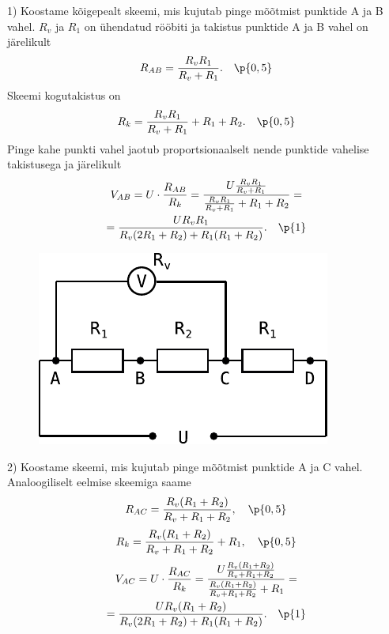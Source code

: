 1) Koostame kõigepealt skeemi, mis kujutab pinge mõõtmist punktide A ja B vahel. $R_v$ ja $R_1$ on ühendatud rööbiti ja takistus punktide A ja B vahel on järelikult
\[
R_{AB}=\frac{R_v R_1}{R_v + R_1}. \quad \p{0,5}
\]
Skeemi kogutakistus on
\[
R_{k}=\frac{R_v R_1}{R_v + R_1} + R_1+R_2. \quad \p{0,5}
\]
Pinge kahe punkti vahel jaotub proportsionaalselt nende punktide vahelise takistusega ja järelikult
\begin{multline*}
V_{AB}=U\cdot\frac{R_{AB}}{R_k}=\frac{U\frac{R_v R_1}{R_v + R_1}}{\frac{R_v R_1}{R_v + R_1} + R_1+R_2}=\\
=\frac{UR_vR_1}{R_v(2R_1+R_2)+R_1(R_1+R_2)}. \quad \p{1}
\end{multline*}

\begin{figure}
\vspace{-1em}
  \begin{center}
    \includegraphics[width=1\linewidth]{2023-v2g-07-sol2.pdf}
  \end{center}
\end{figure}

2) Koostame skeemi, mis kujutab pinge mõõtmist punktide A ja C vahel. Analoogiliselt eelmise skeemiga saame
\[
R_{AC}=\frac{R_v (R_1+R_2)}{R_v + R_1+R_2}, \quad \p{0,5}
\]
\[
R_{k}=\frac{R_v (R_1+R_2)}{R_v + R_1+R_2}+R_1, \quad \p{0,5}
\]
\begin{multline*}
V_{AC}=U\cdot\frac{R_{AC}}{R_k}=\frac{U\frac{R_v (R_1+R_2)}{R_v + R_1+R_2}}{\frac{R_v (R_1+R_2)}{R_v + R_1+R_2}+R_1}=\\
=\frac{UR_v(R_1+R_2)}{R_v(2R_1+R_2)+R_1(R_1+R_2)}. \quad \p{1}
\end{multline*}

